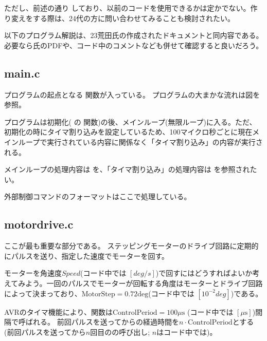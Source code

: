 \documentclass[letterpaper,10pt,dvipdfmx]{sphinxmanual}
\begin{document}
ただし、前述の通り しており、以前のコードを使用できるかは定かでない。作り変えをする際は、24代の方に問い合わせてみることも検討されたい。

以下のプログラム解説は、23荒田氏の作成されたドキュメントと同内容である。必要なら氏のPDFや、コード中のコメントなども併せて確認すると良いだろう。


\subsection{main.c}
\label{\detokenize{nissyu-idohen/saitama:main-c}}

プログラムの起点となる  関数が入っている。
プログラムの大まかな流れは図を参照。

プログラムは初期化( の 関数)の後、メインループ(無限ループ)に入る。ただ、初期化の時にタイマ割り込みを設定しているため、100マイクロ秒ごとに現在メインループで実行されている内容に関係なく「タイマ割り込み」の内容が実行される。

メインループの処理内容は  を、「タイマ割り込み」の処理内容は
 を参照されたい。

外部制御コマンドのフォーマットはここで処理している。


\subsection{motordrive.c}
\label{\detokenize{nissyu-idohen/saitama:motordrive-c}}
ここが最も重要な部分である。
ステッピングモーターのドライブ回路に定期的にパルスを送り、指定した速度でモーターを回す。

モーターを角速度\(Speed\)(コード中では \([deg/s]\))で回すにはどうすればよいか考えてみよう。一回のパルスでモーターが回転する角度はモーターとドライブ回路によって決まっており、\(\mathrm{MotorStep}=0.72 \mathrm{deg}\)(コード中では \([10^{-2}deg]\))である。

AVRのタイマ機能により、関数は\(\mathrm{ControlPeriod}=100 \mu\mathrm{s}\) (コード中では \([\mu\mathrm{s}]\))間隔で呼ばれる。 前回パルスを送ってからの経過時間を\(n\cdot\mathrm{ControlPeriod}\)とする(前回パルスを送ってから\(n\)回目のの呼び出し; \(n\)はコード中では)。
\end{document}
